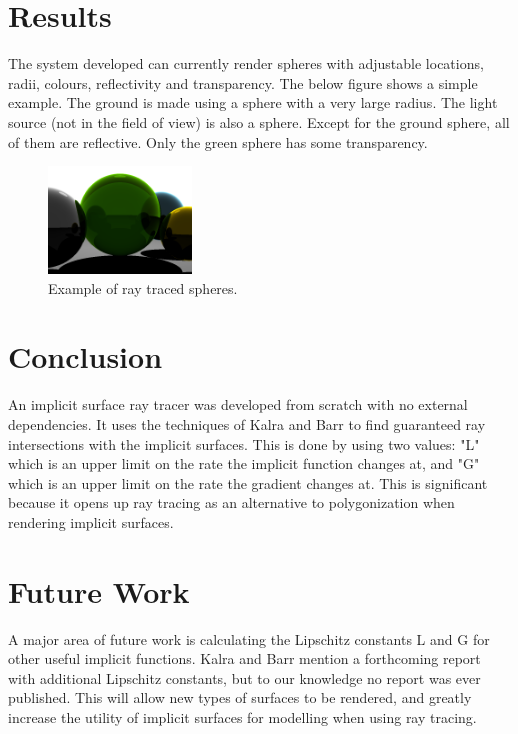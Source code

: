 \documentclass[conference]{acmsiggraph}
\begin{document}
\section{Results}

The system developed can currently render spheres with adjustable locations,
radii, colours, reflectivity and transparency.  The below figure shows a
simple example.  The ground is made using a sphere with a very large radius.
The light source (not in the field of view) is also a sphere.  Except for the
ground sphere, all of them are reflective.  Only the green sphere has some
transparency.

\begin{figure}[ht]
  \centering
  \includegraphics[width=1.5in]{figures/spheres.png}
  \caption{Example of ray traced spheres.}
\end{figure}

\section{Conclusion}

An implicit surface ray tracer was developed from scratch with no external
dependencies.  It uses the techniques of Kalra and Barr \cite{KalraBarr1989}
to find guaranteed ray intersections with the implicit surfaces.  This is done
by using two values: "L" which is an upper limit on the rate the implicit
function changes at, and "G" which is an upper limit on the rate the gradient
changes at.  This is significant because it opens up ray tracing as an 
alternative to polygonization when rendering implicit surfaces.

\section{Future Work}

A major area of future work is calculating the Lipschitz constants L and G
for other useful implicit functions.  Kalra and Barr \cite{KalraBarr1989} 
mention a forthcoming report with additional Lipschitz constants, but to
our knowledge no report was ever published.  This will allow new types of
surfaces to be rendered, and greatly increase the utility of implicit 
surfaces for modelling when using ray tracing.
\end{document}
